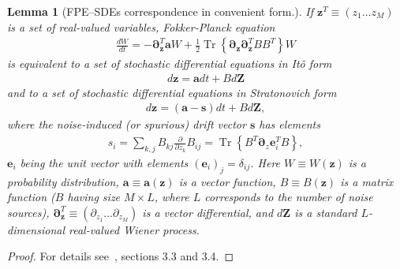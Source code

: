 \documentclass[12pt,aip,jmp,amssymb,amsmath]{revtex4-1}
\newcommand{\zvec}{\boldsymbol{z}}
\newcommand{\Zvec}{\boldsymbol{Z}}
\newcommand{\Trace}[1]{\operatorname{Tr} \left\{ #1 \right\}}
\newtheorem{lemma}{Lemma}
\begin{document}
\begin{lemma}[FPE--SDEs correspondence in convenient form.]
\label{lmm:app-fpe:fpe-sde-real}
    If $\zvec^T \equiv (z_1 \ldots z_M)$ is a set of real-valued variables,
    Fokker-Planck equation
    \begin{equation*}\begin{split}
        \frac{dW}{dt}
        = -\boldsymbol{\partial}_{\zvec}^T \boldsymbol{a} W
        + \frac{1}{2} \Trace{ \boldsymbol{\partial}_{\zvec} \boldsymbol{\partial}_{\zvec}^T B B^T } W
    \end{split}\end{equation*}
    is equivalent to a set of stochastic differential equations in It\^{o} form
    \begin{equation*}\begin{split}
        d\zvec = \boldsymbol{a} dt + B d\Zvec
    \end{split}\end{equation*}
    and to a set of stochastic differential equations in Stratonovich form
    \begin{equation*}\begin{split}
        d\zvec = (\boldsymbol{a} - \boldsymbol{s})dt + B d\Zvec,
    \end{split}\end{equation*}
    where the noise-induced (or spurious) drift vector $\boldsymbol{s}$ has elements
    \begin{equation*}\begin{split}
        s_i
        = \sum_{k,j} B_{kj} \frac{\partial}{\partial z_k} B_{ij}
        = \Trace{B^T \boldsymbol{\partial}_z \boldsymbol{e}_i^T B},
    \end{split}\end{equation*}
    $\boldsymbol{e}_i$ being the unit vector with elements $(\boldsymbol{e}_i)_j = \delta_{ij}$.
    Here $W \equiv W(\zvec)$ is a probability distribution,
    $\boldsymbol{a} \equiv \boldsymbol{a}(\zvec)$ is a vector function,
    $B \equiv B(\zvec)$ is a matrix function ($B$ having size $M \times L$, where $L$ corresponds to the number of noise sources),
    $\boldsymbol{\partial}_{\zvec}^T \equiv (\partial_{z_1} \ldots \partial_{z_M})$ is a vector differential,
    and $d\Zvec$ is a standard $L$-dimensional real-valued Wiener process.
\end{lemma}
\begin{proof}
For details see~\cite{Risken1996}, sections 3.3 and 3.4.
\end{proof}
\end{document}
